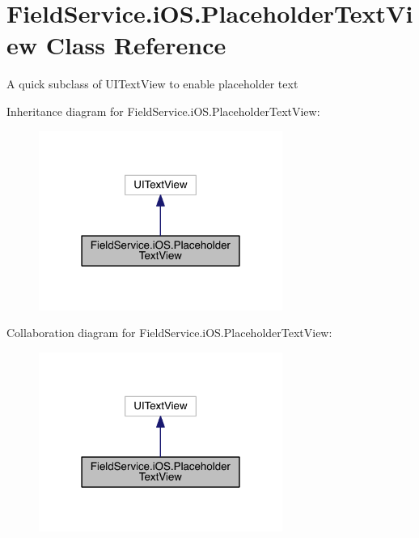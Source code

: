 \hypertarget{class_field_service_1_1i_o_s_1_1_placeholder_text_view}{\section{Field\+Service.\+i\+O\+S.\+Placeholder\+Text\+View Class Reference}
\label{class_field_service_1_1i_o_s_1_1_placeholder_text_view}
}


A quick subclass of U\+I\+Text\+View to enable placeholder text  




Inheritance diagram for Field\+Service.\+i\+O\+S.\+Placeholder\+Text\+View\+:
\nopagebreak
\begin{figure}[H]
\begin{center}
\leavevmode
\includegraphics[width=226pt]{class_field_service_1_1i_o_s_1_1_placeholder_text_view__inherit__graph}
\end{center}
\end{figure}


Collaboration diagram for Field\+Service.\+i\+O\+S.\+Placeholder\+Text\+View\+:
\nopagebreak
\begin{figure}[H]
\begin{center}
\leavevmode
\includegraphics[width=226pt]{class_field_service_1_1i_o_s_1_1_placeholder_text_view__coll__graph}
\end{center}
\end{figure}
